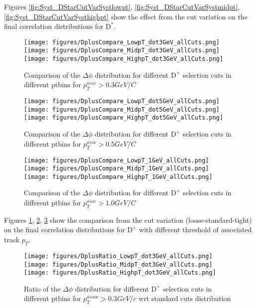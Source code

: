 Figures \ref{fig:Syst_DStarCutVarSystlowpt}, \ref{fig:Syst_DStarCutVarSystmidpt}, \ref{fig:Syst_DStarCutVarSysthighpt} show the effect from the cut variation on the final correlation distributions for $\text{D}^*$.


\newpage

\begin{figure}[h]
\centering
{\texttt{[image: figures/DplusCompare\_LowpT\_dot3GeV\_allCuts.png]}}
{\texttt{[image: figures/DplusCompare\_MidpT\_dot3GeV\_allCuts.png]}}
{\texttt{[image: figures/DplusCompare\_HighpT\_dot3GeV\_allCuts.png]}}
 \caption{Comparison of the $\Delta\phi$ distribution for different $\text{D}^+$ selection cuts in different ptbins for $p_{T}^{assc}>0.3 GeV/C$ }
\label{fig:Syst_DPlusCutdot3GeV}
\end{figure}
\begin{figure}[h]
\centering
{\texttt{[image: figures/DplusCompare\_LowpT\_dot5GeV\_allCuts.png]}}
{\texttt{[image: figures/DplusCompare\_MidpT\_dot5GeV\_allCuts.png]}}
{\texttt{[image: figures/DplusCompare\_HighpT\_dot5GeV\_allCuts.png]}}
 \caption{Comparison of the $\Delta\phi$ distribution for different $\text{D}^+$ selection cuts in different ptbins for $p_{T}^{assc}>0.5 GeV/C$ }
\label{fig:Syst_DPlusCutdot5GeV}
\end{figure}
\begin{figure}[h]
\centering
{\texttt{[image: figures/DplusCompare\_LowpT\_1GeV\_allCuts.png]}}
{\texttt{[image: figures/DplusCompare\_MidpT\_1GeV\_allCuts.png]}}
{\texttt{[image: figures/DplusCompare\_HighpT\_1GeV\_allCuts.png]}}
\caption{Comparison of the $\Delta\phi$ distribution for different $\text{D}^+$ selection cuts in different ptbins for $p_{T}^{assc}>1.0 GeV/C$ }
\label{fig:Syst_DPlusCut1GeV}
\end{figure}

Figures \ref{fig:Syst_DPlusCutdot3GeV}, \ref{fig:Syst_DPlusCutdot5GeV}, \ref{fig:Syst_DPlusCut1GeV} show the comparison from the cut variation (loose-standard-tight) on the final correlation distributions for $\text{D}^+$ with different threshold of associated track $p_{T}$.

\newpage

\begin{figure}[h]
\centering
{\texttt{[image: figures/DplusRatio\_LowpT\_dot3GeV\_allCuts.png]}}
{\texttt{[image: figures/DplusRatio\_MidpT\_dot3GeV\_allCuts.png]}}
{\texttt{[image: figures/DplusRatio\_HighpT\_dot3GeV\_allCuts.png]}}
 \caption{Ratio of the $\Delta\phi$ distribution for different $\text{D}^+$ selection cuts in different ptbins for $p_{T}^{assoc}>0.3 GeV/c$ wrt standard cuts distribution }
\label{fig:Syst_RDPlusCutdot3GeV}
\end{figure}

